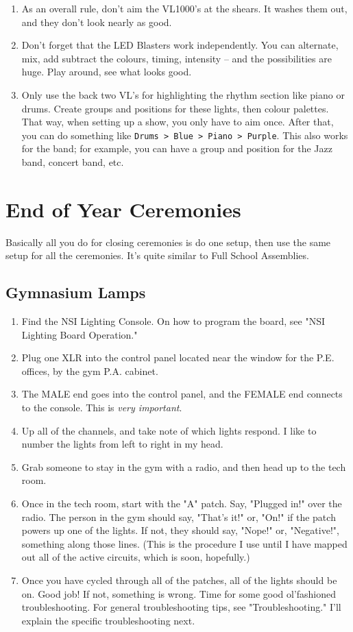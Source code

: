\documentclass[letterpaper,10pt,oneside,headsepline]{scrreprt}
\begin{document}
\begin{enumerate}
\item As an overall rule, don't aim the VL1000's at the shears. It washes them out, and they don't look nearly as good.
\item Don't forget that the LED Blasters work independently. You can alternate, mix, add subtract the colours, timing, intensity -- and the possibilities are huge. Play around, see what looks good. 
\item Only use the back two VL's for highlighting the rhythm section like piano or drums. Create groups and positions for these lights, then colour palettes. That way, when setting up a show, you only have to aim once. After that, you can do something like \texttt{Drums > Blue > Piano > Purple}. This also works for the band; for example, you can have a group and position for the Jazz band, concert band, etc.
\end{enumerate}

\section{End of Year Ceremonies}
Basically all you do for closing ceremonies is do one setup, then use the same setup for all the ceremonies. It's quite similar to Full School Assemblies. 
\subsection{Gymnasium Lamps}
\begin{enumerate}
\item Find the NSI Lighting Console. On how to program the board, see "NSI Lighting Board Operation."
\item Plug one XLR into the control panel located near the window for the P.E. offices, by the gym P.A. cabinet.
\item The MALE end goes into the control panel, and the FEMALE end connects to the console. This is \textit{very important}.
\item Up all of the channels, and take note of which lights respond. I like to number the lights from left to right in my head.
\item Grab someone to stay in the gym with a radio, and then head up to the tech room.
\item Once in the tech room, start with the "A" patch. Say, "Plugged in!" over the radio. The person in the gym should say, "That's it!" or, "On!" if the patch powers up one of the lights. If not, they should say, "Nope!" or, "Negative!", something along those lines. (This is the procedure I use until I have mapped out all of the active circuits, which is soon, hopefully.)
\item Once you have cycled through all of the patches, all of the lights should be on. Good job! If not, something is wrong. Time for some good ol'fashioned troubleshooting. For general troubleshooting tips, see "Troubleshooting." I'll explain the specific troubleshooting next.
\end{enumerate}
\end{document}
